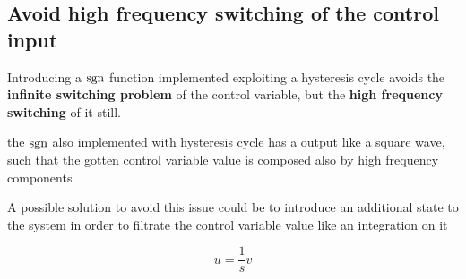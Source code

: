 \subsection{Avoid high frequency switching of the control input}

Introducing a $\operatorname{sgn}$ function implemented exploiting a hysteresis cycle avoids the \textbf{infinite switching problem} of the control variable, but the \textbf{high frequency switching} of it still.

\begin{nb}the $\operatorname{sgn}$ also implemented with hysteresis cycle has a output like a square wave, such that the gotten control variable value is composed also by high frequency components\end{nb}

A possible solution to avoid this issue could be to introduce an additional state to the system in order to filtrate the control variable value like an integration on it

\[
    u = \frac{1}{s} v
\]

